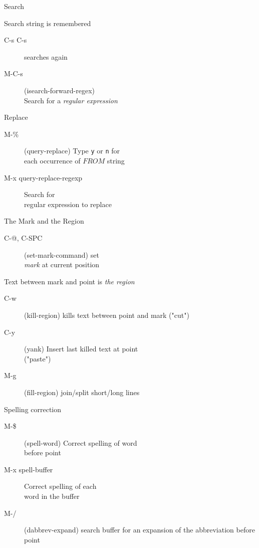 \begin{slide}{}
Search

Search string is remembered
\begin{description}
\item[C-s C-s] searches again

\item[M-C-s] (isearch-forward-regex)
\\
Search for a {\em regular expression}
\end{description}

Replace
\begin{description}
\item[M-\%]
(query-replace)
Type {\tt y} or {\tt n} for \\
each occurrence of $FROM$ string
\item[M-x query-replace-regexp]
Search for \\
regular expression to replace
\end{description}
\end{slide}

\begin{slide}{}
The Mark and the Region
\begin{description}
\item[C-@, C-SPC]
(set-mark-command) set \\
{\em mark} at current position
\end{description}
Text between mark and point is {\em the region}

\begin{description}
\item[C-w]
(kill-region) kills text between point and mark ("cut")
\item[C-y]
(yank) Insert last killed text at point \\
("paste")
\item[M-g]
(fill-region) join/split short/long lines
\end{description}
\end{slide}

\begin{slide}{}
Spelling correction
\begin{description}
\item[M-\$]
(spell-word) Correct spelling of word \\
before point
\item[M-x spell-buffer]
Correct spelling of each \\
word in the buffer
\item[M-/]
(dabbrev-expand) search buffer for an expansion of the abbreviation
before point
\end{description}
\end{slide}

